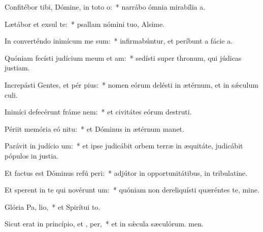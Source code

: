 \item Confitébor tibi, Dómine, in toto  o:~* narrábo ómnia mirabília a.
\item Lætábor et exsul  te:~* psallam nómini tuo, Alsime.
\item In converténdo inimícum me sum:~* infirmabúntur, et períbunt a fácie a.
\item Quóniam fecísti judícium meum et  am:~* sedísti super thronum, qui júdicas justiam.
\item Increpásti Gentes, et pér pius:~* nomen eórum delésti in ætérnum, et in sǽculum culi.
\item Inimíci defecérunt fráme  nem:~* et civitátes eórum destruti.
\item Périit memória eó  nitu:~* et Dóminus in ætérnum manet.
\item Parávit in judício  um:~* et ipse judicábit orbem terræ in æquitáte, judicábit pópulos in justia.
\item Et factus est Dóminus refú peri:~* adjútor in opportunitátibus, in tribulatine.
\item Et sperent in te qui novérunt  um:~* quóniam non dereliquísti quæréntes te, mine.
\item Glória Pa,  lio,~* et Spirítui to.
\item Sicut erat in princípio, et ,  per,~* et in sǽcula sæculórum. men.
